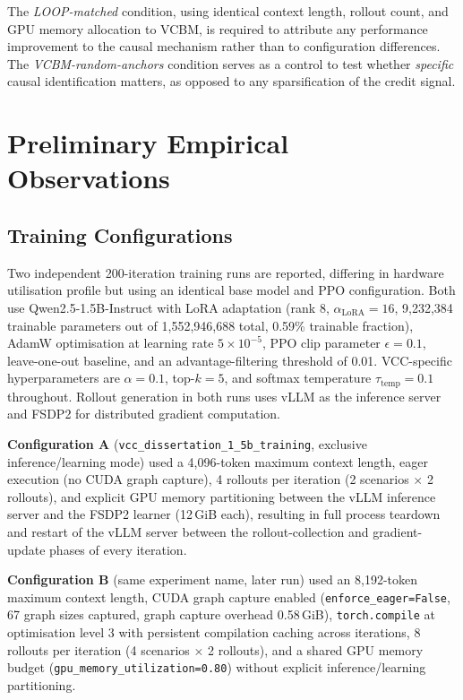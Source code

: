 \documentclass[11pt]{article}
\begin{document}
The \emph{LOOP-matched} condition, using identical context length, rollout
count, and GPU memory allocation to VCBM, is required to attribute any
performance improvement to the causal mechanism rather than to configuration
differences. The \emph{VCBM-random-anchors} condition serves as a control to
test whether \emph{specific} causal identification matters, as opposed to any
sparsification of the credit signal.

\section{Preliminary Empirical Observations}

\subsection{Training Configurations}

Two independent 200-iteration training runs are reported, differing in
hardware utilisation profile but using an identical base model and PPO
configuration. Both use Qwen2.5-1.5B-Instruct \cite{qwen2024} with LoRA
adaptation \cite{lora2021} (rank 8,
$\alpha_{\mathrm{LoRA}}=16$, 9{,}232{,}384 trainable parameters out of
1{,}552{,}946{,}688 total, 0.59\% trainable fraction), AdamW optimisation
\cite{adamw2019} at
learning rate $5\times10^{-5}$, PPO clip parameter $\epsilon=0.1$, leave-one-out
baseline, and an advantage-filtering threshold of 0.01. VCC-specific
hyperparameters are $\alpha = 0.1$, top-$k = 5$, and softmax temperature
$\tau_{\mathrm{temp}} = 0.1$ throughout. Rollout generation in both runs uses
vLLM \cite{vllm2023} as the inference server and FSDP2 \cite{fsdp2023} for
distributed gradient computation.

\textbf{Configuration A} (\texttt{vcc\_dissertation\_1\_5b\_training}, exclusive
inference/learning mode) used a 4{,}096-token maximum context length, eager
execution (no CUDA graph capture), 4 rollouts per iteration (2 scenarios
$\times$ 2 rollouts), and explicit GPU memory partitioning between the vLLM
inference server and the FSDP2 learner (12\,GiB each), resulting in full
process teardown and restart of the vLLM server between the rollout-collection
and gradient-update phases of every iteration.

\textbf{Configuration B} (same experiment name, later run) used an
8{,}192-token maximum context length, CUDA graph capture enabled
(\texttt{enforce\_eager=False}, 67 graph sizes captured, graph capture
overhead 0.58\,GiB), \texttt{torch.compile} at optimisation level 3 with
persistent compilation caching across iterations, 8 rollouts per iteration (4
scenarios $\times$ 2 rollouts), and a shared GPU memory budget
(\texttt{gpu\_memory\_utilization=0.80}) without explicit
inference/learning partitioning.
\end{document}
